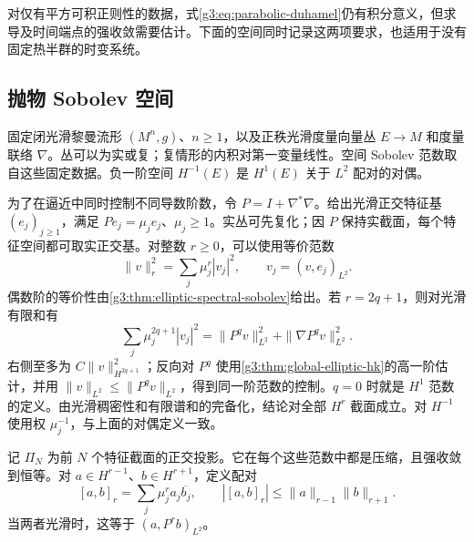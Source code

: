 对仅有平方可积正则性的数据，式\eqref{g3:eq:parabolic-duhamel}仍有积分意义，但求导及时间端点的强收敛需要估计。下面的空间同时记录这两项要求，也适用于没有固定热半群的时变系统。

\subsection{抛物 Sobolev 空间}
\label{g3:subsec:2601:02}
固定闭光滑黎曼流形 \((M^n,g)\)、\(n\ge1\)，以及正秩光滑度量向量丛 \(E\to M\) 和度量联络 \(\nabla\)。丛可以为实或复；复情形的内积对第一变量线性。空间 Sobolev 范数取自这些固定数据。负一阶空间 \(H^{-1}(E)\) 是 \(H^1(E)\) 关于 \(L^2\) 配对的对偶。

\ProseParagraphBreak
为了在逼近中同时控制不同导数阶数，令 \(P=I+\nabla^*\nabla\)。给出光滑正交特征基 \((e_j)_{j\ge1}\)，满足 \(Pe_j=\mu_je_j\)、\(\mu_j\ge1\)。实丛可先复化；因 \(P\) 保持实截面，每个特征空间都可取实正交基。对整数 \(r\ge0\)，可以使用等价范数
\begin{equation}\label{g3:eq:parabolic-spectral-norm}
	\|v\|_r^2=\sum_j\mu_j^r|v_j|^2,
	\qquad v_j=(v,e_j)_{L^2}.
\end{equation}
偶数阶的等价性由\cref{g3:thm:elliptic-spectral-sobolev}给出。若 \(r=2q+1\)，则对光滑有限和有
\[
	\sum_j\mu_j^{2q+1}|v_j|^2
	=\|P^qv\|_{L^2}^2+\|\nabla P^qv\|_{L^2}^2.
\]
右侧至多为 \(C\|v\|_{H^{2q+1}}^2\)；反向对 \(P^q\) 使用\cref{g3:thm:global-elliptic-hk}的高一阶估计，并用 \(\|v\|_{L^2}\le\|P^qv\|_{L^2}\)，得到同一阶范数的控制。\(q=0\) 时就是 \(H^1\) 范数的定义。由光滑稠密性和有限谱和的完备化，结论对全部 \(H^r\) 截面成立。对 \(H^{-1}\) 使用权 \(\mu_j^{-1}\)，与上面的对偶定义一致。

\ProseParagraphBreak
记 \(\Pi_N\) 为前 \(N\) 个特征截面的正交投影。它在每个这些范数中都是压缩，且强收敛到恒等。对 \(a\in H^{r-1}\)、\(b\in H^{r+1}\)，定义配对
\[
	[a,b]_r=\sum_j\mu_j^ra_j\overline{b_j},
	\qquad |[a,b]_r|\le\|a\|_{r-1}\|b\|_{r+1}.
\]
当两者光滑时，这等于 \((a,P^rb)_{L^2}\)。

